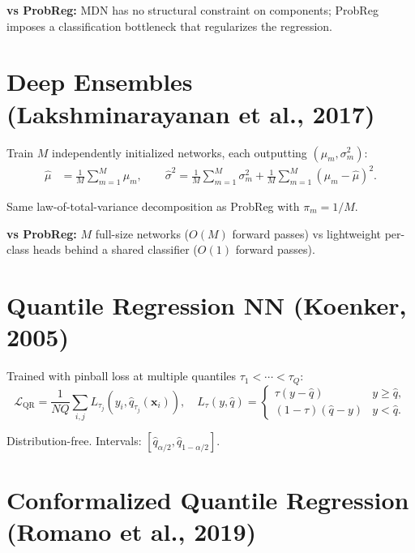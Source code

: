 \documentclass[11pt,a4paper]{article}
\theoremstyle{definition}
\newcommand{\bx}{\mathbf{x}}
\begin{document}
\textbf{vs ProbReg:} MDN has no structural constraint on components;
ProbReg imposes a classification bottleneck that regularizes the regression.

\section{Deep Ensembles (Lakshminarayanan et al., 2017)}

Train $M$ independently initialized networks, each outputting $(\mu_m, \sigma_m^2)$:
\begin{align}
  \hat{\mu} &= \frac{1}{M}\sum_{m=1}^M \mu_m, \qquad
  \hat{\sigma}^2 = \frac{1}{M}\sum_{m=1}^M \sigma_m^2 + \frac{1}{M}\sum_{m=1}^M (\mu_m - \hat{\mu})^2.
\end{align}

Same law-of-total-variance decomposition as ProbReg with $\pi_m = 1/M$.

\textbf{vs ProbReg:} $M$ full-size networks ($O(M)$ forward passes) vs
lightweight per-class heads behind a shared classifier ($O(1)$ forward passes).

\section{Quantile Regression NN (Koenker, 2005)}

Trained with pinball loss at multiple quantiles $\tau_1 < \cdots < \tau_Q$:
\[
  \mathcal{L}_{\mathrm{QR}} = \frac{1}{NQ}\sum_{i,j} L_{\tau_j}(y_i, \hat{q}_{\tau_j}(\bx_i)),
  \quad
  L_\tau(y, \hat{q}) = \begin{cases}
    \tau(y - \hat{q}) & y \geq \hat{q}, \\
    (1-\tau)(\hat{q} - y) & y < \hat{q}.
  \end{cases}
\]

Distribution-free. Intervals: $[\hat{q}_{\alpha/2}, \hat{q}_{1-\alpha/2}]$.

\section{Conformalized Quantile Regression (Romano et al., 2019)}
\label{sec:cqr}
\end{document}
